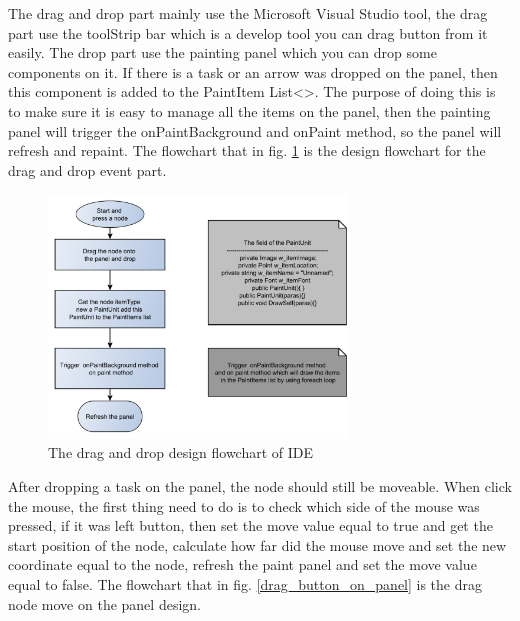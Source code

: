 The drag and drop part mainly use the Microsoft Visual Studio tool, the drag part use the toolStrip bar which is a develop tool you can drag button from it easily. The drop part use the painting panel which you can drop some components on it. If there is a task or an arrow was dropped on the panel, then this component is added to the PaintItem List<>. The purpose of doing this is to make sure it is easy to manage all the items on the panel, then the painting panel will trigger the onPaintBackground and onPaint method, so the panel will refresh and repaint. The flowchart that in fig. \ref{drag_drop_design} is the design flowchart for the drag and drop event part.
\begin{figure}[!ht]
	\begin{center}
		\includegraphics[width=80mm]{./Images/Software/drag_drop_design.png}
		\caption{The drag and drop design flowchart of IDE}
		\label{drag_drop_design}
	\end{center}
\end{figure} 
After dropping a task on the panel, the node should still be moveable. When click the mouse, the first thing need to do is to check which side of the mouse was pressed, if it was left button, then set the move value equal to true and get the start position of the node, calculate how far did the mouse move and set the new coordinate equal to the node, refresh the paint panel and set the move value equal to false. The flowchart that in fig. \ref{drag_button_on_panel} is the drag node move on the panel design.
